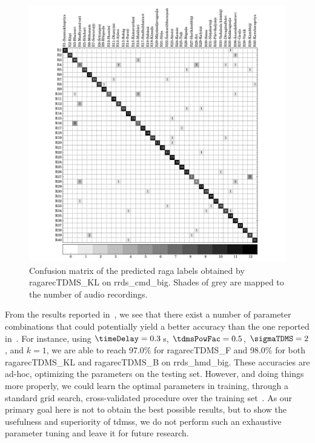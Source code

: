 \begin{figure}
	\begin{center}
		\includegraphics[width=\figSizeHundred]{ch07_ragaRecognition/figures/carnaticPhaseSapce_config_1078.pdf}
	\end{center}
	\caption{Confusion matrix of the predicted \gls{raga} labels obtained by \acrshort{ragarecTDMS_KL} on \acrshort{rrds_cmd_big}. Shades of grey are mapped to the number of audio recordings.} 
	\label{confusion_mtx_carnatic_tdms}
\end{figure}

From the results reported in~, we see that there exist a number of parameter combinations that could potentially yield a better accuracy than the one reported in~. For instance, using  $\timeDelay=0.3$\,s, $\tdmsPowFac=0.5$, $\sigmaTDMS=2$, and $k=1$, we are able to reach 97.0\% for \acrshort{ragarecTDMS_F} and 98.0\% for both \acrshort{ragarecTDMS_KL} and \acrshort{ragarecTDMS_B} on \acrshort{rrds_hmd_big}. These accuracies are ad-hoc, optimizing the parameters on the testing set. However, and doing things more properly, we could learn the optimal parameters in training, through a standard grid search, cross-validated procedure over the training set~\cite{Mitchell97BOOK}. As our primary goal here is not to obtain the best possible results, but to show the usefulness and superiority of \glspl{tdms}, we do not perform such an exhaustive parameter tuning and leave it for future research.

